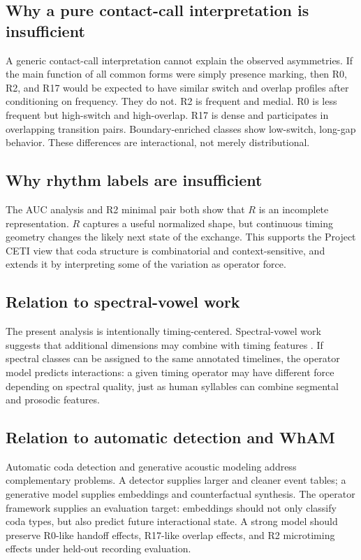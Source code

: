 \documentclass[11pt]{article}
\begin{document}
\subsection{Why a pure contact-call interpretation is insufficient}

A generic contact-call interpretation cannot explain the observed asymmetries. If the main function of all common forms were simply presence marking, then R0, R2, and R17 would be expected to have similar switch and overlap profiles after conditioning on frequency. They do not. R2 is frequent and medial. R0 is less frequent but high-switch and high-overlap. R17 is dense and participates in overlapping transition pairs. Boundary-enriched classes show low-switch, long-gap behavior. These differences are interactional, not merely distributional.

\subsection{Why rhythm labels are insufficient}

The AUC analysis and R2 minimal pair both show that $R$ is an incomplete representation. $R$ captures a useful normalized shape, but continuous timing geometry changes the likely next state of the exchange. This supports the Project CETI view that coda structure is combinatorial and context-sensitive, and extends it by interpreting some of the variation as operator force.

\subsection{Relation to spectral-vowel work}

The present analysis is intentionally timing-centered. Spectral-vowel work suggests that additional dimensions may combine with timing features \citep{begus2025vowels,begus2026phonology}. If spectral classes can be assigned to the same annotated timelines, the operator model predicts interactions: a given timing operator may have different force depending on spectral quality, just as human syllables can combine segmental and prosodic features.

\subsection{Relation to automatic detection and WhAM}

Automatic coda detection and generative acoustic modeling address complementary problems. A detector supplies larger and cleaner event tables; a generative model supplies embeddings and counterfactual synthesis. The operator framework supplies an evaluation target: embeddings should not only classify coda types, but also predict future interactional state. A strong model should preserve R0-like handoff effects, R17-like overlap effects, and R2 microtiming effects under held-out recording evaluation.
\end{document}
